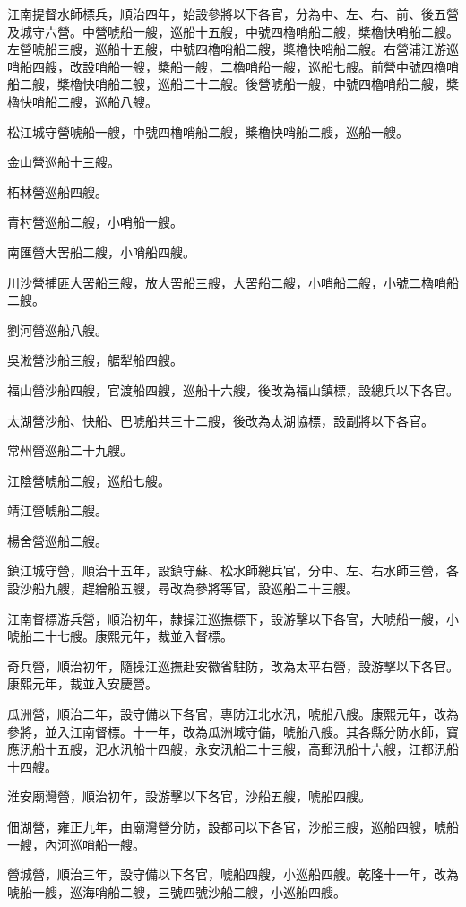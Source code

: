 \begin{pinyinscope}
江南提督水師標兵，順治四年，始設參將以下各官，分為中、左、右、前、後五營及城守六營。中營唬船一艘，巡船十五艘，中號四櫓哨船二艘，槳櫓快哨船二艘。左營唬船三艘，巡船十五艘，中號四櫓哨船二艘，槳櫓快哨船二艘。右營浦江游巡哨船四艘，改設哨船一艘，槳船一艘，二櫓哨船一艘，巡船七艘。前營中號四櫓哨船二艘，槳櫓快哨船二艘，巡船二十二艘。後營唬船一艘，中號四櫓哨船二艘，槳櫓快哨船二艘，巡船八艘。

松江城守營唬船一艘，中號四櫓哨船二艘，槳櫓快哨船二艘，巡船一艘。

金山營巡船十三艘。

柘林營巡船四艘。

青村營巡船二艘，小哨船一艘。

南匯營大罟船二艘，小哨船四艘。

川沙營捕匪大罟船三艘，放大罟船三艘，大罟船二艘，小哨船二艘，小號二櫓哨船二艘。

劉河營巡船八艘。

吳淞營沙船三艘，艍犁船四艘。

福山營沙船四艘，官渡船四艘，巡船十六艘，後改為福山鎮標，設總兵以下各官。

太湖營沙船、快船、巴唬船共三十二艘，後改為太湖協標，設副將以下各官。

常州營巡船二十九艘。

江陰營唬船二艘，巡船七艘。

靖江營唬船二艘。

楊舍營巡船二艘。

鎮江城守營，順治十五年，設鎮守蘇、松水師總兵官，分中、左、右水師三營，各設沙船九艘，趕繒船五艘，尋改為參將等官，設巡船二十三艘。

江南督標游兵營，順治初年，隸操江巡撫標下，設游擊以下各官，大唬船一艘，小唬船二十七艘。康熙元年，裁並入督標。

奇兵營，順治初年，隨操江巡撫赴安徽省駐防，改為太平右營，設游擊以下各官。康熙元年，裁並入安慶營。

瓜洲營，順治二年，設守備以下各官，專防江北水汛，唬船八艘。康熙元年，改為參將，並入江南督標。十一年，改為瓜洲城守備，唬船八艘。其各縣分防水師，寶應汛船十五艘，氾水汛船十四艘，永安汛船二十三艘，高郵汛船十六艘，江都汛船十四艘。

淮安廟灣營，順治初年，設游擊以下各官，沙船五艘，唬船四艘。

佃湖營，雍正九年，由廟灣營分防，設都司以下各官，沙船三艘，巡船四艘，唬船一艘，內河巡哨船一艘。

營城營，順治三年，設守備以下各官，唬船四艘，小巡船四艘。乾隆十一年，改為唬船一艘，巡海哨船二艘，三號四號沙船二艘，小巡船四艘。


\end{pinyinscope}
